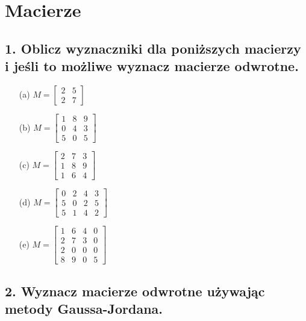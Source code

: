 \section{Macierze}


\subsection*{1. Oblicz wyznaczniki dla poniższych macierzy i jeśli to możliwe wyznacz macierze odwrotne.}

\begin{enumerate}
    \item[(a)] \( M = \begin{bmatrix} 2 & 5 \\ 2 & 7 \end{bmatrix} \)
    
    \item[(b)] \( M = \begin{bmatrix} 1 & 8 & 9 \\ 0 & 4 & 3 \\ 5 & 0 & 5 \end{bmatrix} \)
    
    \item[(c)] \( M = \begin{bmatrix} 2 & 7 & 3 \\ 1 & 8 & 9 \\ 1 & 6 & 4 \end{bmatrix} \)
    
    \item[(d)] \( M = \begin{bmatrix} 0 & 2 & 4 & 3 \\ 5 & 0 & 2 & 5 \\ 5 & 1 & 4 & 2 \end{bmatrix} \)
    
    \item[(e)] \( M = \begin{bmatrix} 1 & 6 & 4 & 0 \\ 2 & 7 & 3 & 0 \\ 2 & 0 & 0 & 0 \\ 8 & 9 & 0 & 5 \end{bmatrix} \)
\end{enumerate}

\subsection*{2. Wyznacz macierze odwrotne używając metody Gaussa-Jordana.}

